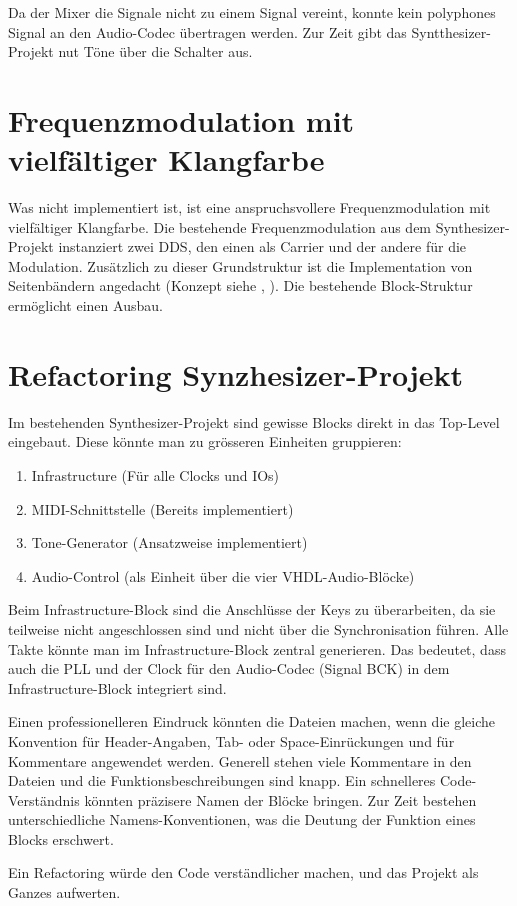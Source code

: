 Da der Mixer die Signale nicht zu einem Signal vereint, konnte kein polyphones Signal an den Audio-Codec übertragen werden. Zur Zeit gibt das Syntthesizer-Projekt nut Töne über die Schalter aus.

\section{Frequenzmodulation mit vielfältiger Klangfarbe}

Was nicht implementiert ist, ist eine anspruchsvollere Frequenzmodulation mit vielfältiger Klangfarbe. Die bestehende Frequenzmodulation aus dem Synthesizer-Projekt instanziert zwei DDS, den einen als Carrier und der andere für die Modulation. Zusätzlich zu dieser Grundstruktur ist die Implementation von Seitenbändern angedacht (Konzept siehe \cite{synthesizer_1}, \cite{synthesizer_2}). Die bestehende Block-Struktur ermöglicht einen Ausbau.

\section{Refactoring Synzhesizer-Projekt}

Im bestehenden Synthesizer-Projekt sind gewisse Blocks direkt in das Top-Level eingebaut. Diese könnte man zu grösseren Einheiten gruppieren:
\begin{enumerate}
 \item Infrastructure (Für alle Clocks und IOs)
 \item MIDI-Schnittstelle (Bereits implementiert)
 \item Tone-Generator (Ansatzweise implementiert)
 \item Audio-Control (als Einheit über die vier VHDL-Audio-Blöcke)
\end{enumerate}

Beim Infrastructure-Block sind die Anschlüsse der Keys zu überarbeiten, da sie teilweise nicht angeschlossen sind und nicht über die Synchronisation führen. Alle Takte könnte man im Infrastructure-Block zentral generieren. Das bedeutet, dass auch die PLL und der Clock für den Audio-Codec (Signal BCK) in dem Infrastructure-Block integriert sind.

Einen professionelleren Eindruck könnten die Dateien machen, wenn die gleiche Konvention für Header-Angaben, Tab- oder Space-Einrückungen und für Kommentare angewendet werden. Generell stehen viele Kommentare in den Dateien und die Funktionsbeschreibungen sind knapp. Ein schnelleres Code-Verständnis könnten präzisere Namen der Blöcke bringen. Zur Zeit bestehen unterschiedliche Namens-Konventionen, was die Deutung der Funktion eines Blocks erschwert.

Ein Refactoring würde den Code verständlicher machen, und das Projekt als Ganzes aufwerten.

